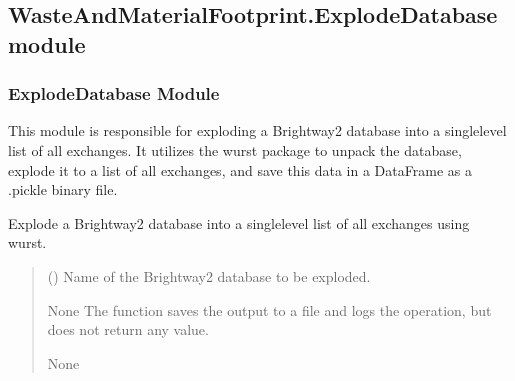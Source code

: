 \documentclass[letterpaper,10pt,english]{sphinxmanual}
\begin{document}
\subsection{WasteAndMaterialFootprint.ExplodeDatabase module}
\label{\detokenize{WMFootprint_api:module-WasteAndMaterialFootprint.ExplodeDatabase}}\label{\detokenize{WMFootprint_api:wasteandmaterialfootprint-explodedatabase-module}}

\subsubsection{ExplodeDatabase Module}
\label{\detokenize{WMFootprint_api:explodedatabase-module}}
\sphinxAtStartPar
This module is responsible for exploding a Brightway2 database into a single\sphinxhyphen{}level list of all exchanges.
It utilizes the wurst package to unpack the database, explode it to a list of all exchanges, and save this data 
in a DataFrame as a .pickle binary file.

\begin{fulllineitems}
\label{\detokenize{WMFootprint_api:WasteAndMaterialFootprint.ExplodeDatabase.ExplodeDatabase}}
\pysigstartsignatures
{}
\pysigstopsignatures
\sphinxAtStartPar
Explode a Brightway2 database into a single\sphinxhyphen{}level list of all exchanges using wurst.
\begin{quote}\begin{description}
\sphinxAtStartPar
{} () \textendash{} Name of the Brightway2 database to be exploded.

\sphinxAtStartPar
None
The function saves the output to a file and logs the operation, but does not return any value.

\sphinxAtStartPar
None

\end{description}\end{quote}

\end{fulllineitems}
\end{document}
